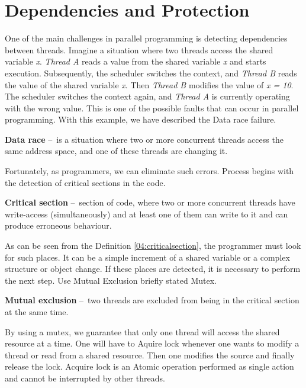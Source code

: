 \section{Dependencies and Protection}
\label{dependenciesandprotection}

One of the main challenges in parallel programming is detecting dependencies between threads. Imagine a situation where two threads access the shared variable \emph{x}. \emph{Thread A} reads a value from the shared variable \emph{x} and starts execution. Subsequently, the scheduler switches the context, and \emph{Thread B} reads the value of the shared variable \emph{x}. Then \emph{Thread B} modifies the value of \emph{x = 10}. The scheduler switches the context again, and \emph{Thread A} is currently operating with the wrong value. This is one of the possible faults that can occur in parallel programming. With this example, we have described the Data race failure.

\begin{definition}
    \textbf{Data race} \---\ is a situation where two or more concurrent threads access the same address space, and one of these threads are changing it.
\end{definition}
Fortunately, as programmers, we can eliminate such errors. Process begins with the detection of critical sections in the code.
\begin{definition}
	\label{04:criticalsection}
 	\textbf{Critical section} \---\ section of code, where two or more concurrent threads have write-access (simultaneously) and at least one of them can write to it and can produce erroneous behaviour.
\end{definition}
As can be seen from the Definition \ref{04:criticalsection}, the programmer must look for such places. It can be a simple increment of a shared variable or a complex structure or object change. If these places are detected, it is necessary to perform the next step. Use Mutual Exclusion briefly stated Mutex.
\begin {definition}
  \textbf{Mutual exclusion} \---\ two threads are excluded from being in the critical section at the same time.
\end {definition}
By using a mutex, we guarantee that only one thread will access the shared resource at a time. One will have to Aquire lock whenever one wants to modify a thread or read from a shared resource. Then one modifies the source and finally release the lock. Acquire lock is an Atomic operation performed as single action and cannot be interrupted by other threads.

